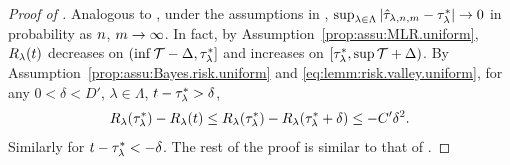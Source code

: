 \begin{proof}[Proof of ]
Analogous to , under the assumptions in , $\sup_{\lambda \in \Lambda} |{\hat{\tau}_{\lambda, {n}, m}} - {\tau^*_\lambda}| \to 0$ in probability as ${n}$, $m \to \infty$.
    In fact, by Assumption~\ref{prop:assu:MLR.uniform}, ${R_{\lambda}}({t})$ decreases on $(\inf \mathcal{T} - \Delta, {\tau^*_\lambda}]$ and increases on $[{\tau^*_\lambda}, \sup \mathcal{T} + \Delta)$.
    By Assumption~\ref{prop:assu:Bayes.risk.uniform} and \eqref{eq:lemm:risk.valley.uniform}, for any $0 < \delta < D'$, $\lambda \in \Lambda$, ${t} - {\tau^*_\lambda} > \delta$,
    \begin{align*}
        {R_{\lambda}}({\tau^*_\lambda}) - {R_{\lambda}}({t})
        \le {R_{\lambda}}({\tau^*_\lambda}) - {R_{\lambda}}({\tau^*_\lambda} + \delta)
        \le -C'\delta^2.
    \end{align*}
    Similarly for ${t} - {\tau^*_\lambda} < -\delta$. The rest of the proof is similar to that of .

\end{proof}
